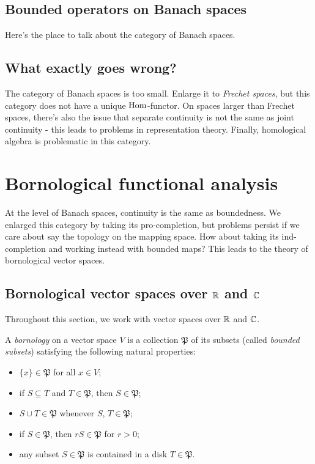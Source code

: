 \subsection{Bounded operators on Banach spaces}

Here's the place to talk about the category of Banach spaces.

\subsection{What exactly goes wrong?}

The category of Banach spaces is too small. Enlarge it to \textit{Frechet spaces}, but this category does not have a unique \(\operatorname{Hom}\)-functor. On spaces larger than Frechet spaces, there's also the issue that separate continuity is not the same as joint continuity - this leads to problems in representation theory. Finally, homological algebra is problematic in this category. 

\section{Bornological functional analysis}

At the level of Banach spaces, continuity is the same as boundedness. We enlarged this category by taking its pro-completion, but problems persist if we care about say the topology on the mapping space. How about taking its ind-completion and working instead with bounded maps? This leads to the theory of bornological vector spaces. 


\subsection{Bornological vector spaces over \(\mathbb R\) and \(\mathbb C\)}

Throughout this section, we work with vector spaces over \(\mathbb R\) and \(\mathbb C\).

\begin{definition}[Bornology]
A \textit{bornology} on a vector space \(V\) is a collection \(\mathfrak{P}\) of its subsets (called \textit{bounded subsets}) satisfying the following natural properties:

\begin{itemize}
\item \(\{x\} \in \mathfrak{P}\) for all \(x \in V\);
\item if \(S \subseteq T\) and \(T \in \mathfrak{P}\), then \(S \in \mathfrak{P}\);
\item \(S \cup T \in \mathfrak{P}\) whenever \(S\), \(T \in \mathfrak{P}\);
\item if \(S \in \mathfrak{P}\), then \(r S \in \mathfrak{P}\) for \(r>0\);
\item any subset \(S \in \mathfrak{P}\) is contained in a disk \(T \in \mathfrak{P}\). 
\end{itemize}
 
\end{definition}



